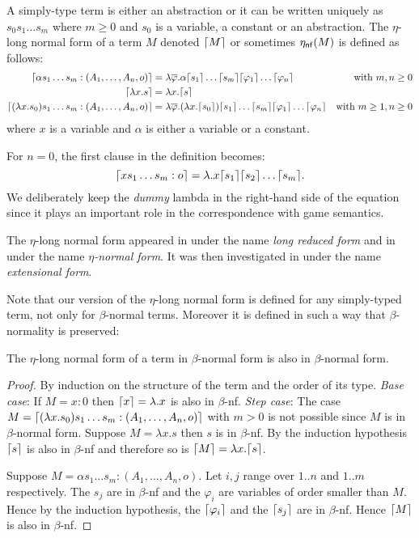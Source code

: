 \begin{dfn}
A simply-type term is either an abstraction or it can be written uniquely as
$s_0 s_1 \ldots s_m$ where $m\geq0$ and $s_0$ is a variable, a
constant or an abstraction.
The $\eta$-long normal form of a term $M$ denoted $\lceil M\rceil$ or sometimes $\eta_{\sf nf}(M)$
is defined as follows:
\begin{align*}
\lceil \alpha s_1 \ldots s_m : (A_1,\ldots,A_n,o)\rceil &= \lambda \overline{\varphi} . \alpha \lceil s_1\rceil\ldots \lceil s_m\rceil \lceil \varphi_1\rceil \ldots \lceil \varphi_n\rceil
& \mbox{with $m,n\geq0$}\\
\lceil \lambda x . s \rceil &= \lambda x . \lceil s\rceil \\
\lceil (\lambda x . s_0) s_1 \ldots s_m : (A_1,\ldots,A_n,o) \rceil &= \lambda \overline{\varphi} . (\lambda x . \lceil s_0\rceil) \lceil s_1\rceil \ldots \lceil s_m\rceil \lceil \varphi_1\rceil \ldots \lceil \varphi_n\rceil
& \mbox{with $m\geq 1,n\geq0$}
\end{align*}
where $x$ is a variable and $\alpha$ is either a variable or a constant.
\end{dfn}

For $n=0$, the first clause in the definition becomes:
$$\lceil x s_1 \ldots s_m : o\rceil = \lambda . x \lceil s_1\rceil \lceil s_2\rceil \ldots \lceil s_m\rceil.$$
We deliberately keep the \textsl{dummy} lambda in the right-hand side of the equation since it
plays an important role in the correspondence with game semantics.

The $\eta$-long normal form appeared in \citep{DBLP:journals/tcs/JensenP76}
under the name \emph{long reduced form}
and in \citep{DBLP:journals/tcs/Huet75}
under the name \emph{$\eta$-normal form}. It was then investigated in \citep{huet76}
under the name \emph{extensional form}.

Note that our version of the $\eta$-long normal form is defined for any simply-typed term, not only for $\beta$-normal terms.
Moreover it is defined in such a way that $\beta$-normality is preserved:
\begin{lem}
The $\eta$-long normal form of a term in $\beta$-normal form is also in $\beta$-normal form.
\end{lem}
\begin{proof}
By induction on the structure of the term and the order of its type.
\emph{Base case}:
If $M=x:0$ then $\lceil x\rceil = \lambda . x$ is also in $\beta$-nf.
\emph{Step case}:
The case $M = \lceil (\lambda x . s_0) s_1 \ldots s_m : (A_1,\ldots,A_n,o)\rceil$ with $m>0$ is not possible since $M$ is in
$\beta$-normal form.
Suppose $M = \lambda x . s$ then $s$ is in $\beta$-nf. By the induction hypothesis $\lceil s\rceil$ is also in $\beta$-nf and therefore
so is $\lceil M\rceil = \lambda x . \lceil s\rceil$.

Suppose $M= \alpha s_1 \ldots s_m : (A_1,\ldots,A_n,o)$. Let $i,j$ range over $1..n$ and $1..m$ respectively.
The $s_j$ are in $\beta$-nf and the $\varphi_i$ are variables of order smaller than $M$. Hence by the induction hypothesis,
the $\lceil \varphi_i\rceil$ and the $\lceil s_j\rceil$ are in $\beta$-nf.
Hence $\lceil M\rceil$ is also in $\beta$-nf.
\end{proof}


